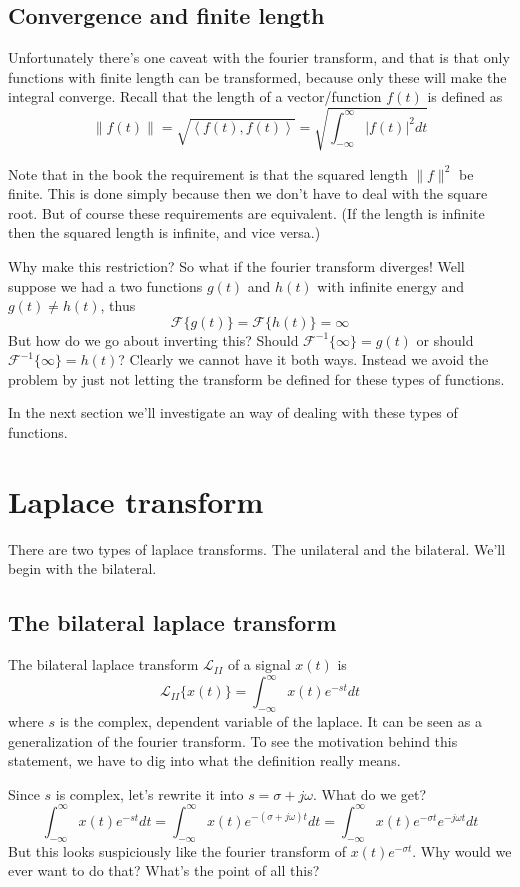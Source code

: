 \documentclass{article}
\newcommand{\0}{{\mathbf{0}}}
\newcommand{\inner}[1]{\left\langle #1 \right\rangle}
\begin{document}
\clearpage
\subsection{Convergence and finite length}
Unfortunately there's one caveat with the fourier transform, and that is that only
functions with finite length can be transformed, because only these will make the integral converge.
Recall that the length of a vector/function $f(t)$
is defined as
$$ \| f(t) \| = \sqrt{\inner{f(t),f(t)}} = \sqrt{ \int^{\infty}_{-\infty} |f(t)|^2 dt } $$

Note that in the book the requirement is that the squared length $\| f \|^2$ be finite.
This is done simply because then we don't have to deal with the square root.
But of course these requirements are equivalent. (If the length is infinite then the squared length
is infinite, and vice versa.)

Why make this restriction? So what if the fourier transform diverges! Well suppose
we had a two functions $g(t)$ and $h(t)$ with infinite energy and $g(t)\neq h(t)$, thus
$$ \mathscr{F}\{ g(t) \} = \mathscr{F}\{ h(t) \} =  \infty $$
But how do we go about inverting this? Should $\mathscr{F}^{-1}\{ \infty \} = g(t)$ or should
$\mathscr{F}^{-1}\{ \infty \} = h(t)$? Clearly we cannot have it both ways. Instead we avoid the
problem by just not letting the transform be defined for these types of functions.

In the next section we'll investigate an way of dealing with these types of functions.

\clearpage
\section{Laplace transform}
There are two types of laplace transforms. The unilateral and the bilateral.
We'll begin with the bilateral.

\subsection{The bilateral laplace transform}
The bilateral laplace transform $\mathscr{L}_{II}$ of a signal $x(t)$ is
$$ \mathscr{L}_{II} \{ x(t) \} = \int^{\infty}_{-\infty} x(t)e^{-st} dt $$
where $s$ is the complex, dependent variable of the laplace. It can be seen as a generalization of the fourier transform.
To see the motivation behind this statement, we have to dig into what the definition really means.

Since $s$ is complex, let's rewrite it into $s=\sigma + j\omega$. What do we get?
$$ \int^{\infty}_{-\infty} x(t)e^{-st} dt = \int^{\infty}_{-\infty} x(t)e^{-(\sigma+j\omega)t} dt = \int^{\infty}_{-\infty} x(t)e^{-\sigma t}e^{-j\omega t} dt $$
But this looks suspiciously like the fourier transform of $x(t)e^{-\sigma t}$. Why would we ever want to do that? What's the point of all this?
\end{document}
